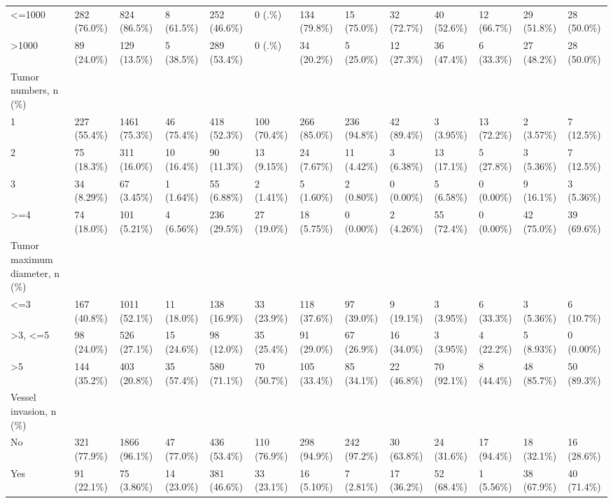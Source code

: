 \begin{landscape}
\begin{center}
\begin{longtable}{p{5.2cm}p{3.0cm}}
<=1000 & 282 (76.0\%) & 824 (86.5\%) & 8 (61.5\%) & 252 (46.6\%) & 0 (.\%) & 134 (79.8\%) & 15 (75.0\%) & 32 (72.7\%) & 40 (52.6\%) & 12 (66.7\%) & 29 (51.8\%) & 28 (50.0\%) \\
>1000 & 89 (24.0\%) & 129 (13.5\%) & 5 (38.5\%) & 289 (53.4\%) & 0 (.\%) & 34 (20.2\%) & 5 (25.0\%) & 12 (27.3\%) & 36 (47.4\%) & 6 (33.3\%) & 27 (48.2\%) & 28 (50.0\%) \\
Tumor numbers, n (\%) &  &  &  &  &  &  &  &  &  &  &  &  \\
1 & 227 (55.4\%) & 1461 (75.3\%) & 46 (75.4\%) & 418 (52.3\%) & 100 (70.4\%) & 266 (85.0\%) & 236 (94.8\%) & 42 (89.4\%) & 3 (3.95\%) & 13 (72.2\%) & 2 (3.57\%) & 7 (12.5\%) \\
2 & 75 (18.3\%) & 311 (16.0\%) & 10 (16.4\%) & 90 (11.3\%) & 13 (9.15\%) & 24 (7.67\%) & 11 (4.42\%) & 3 (6.38\%) & 13 (17.1\%) & 5 (27.8\%) & 3 (5.36\%) & 7 (12.5\%) \\
3 & 34 (8.29\%) & 67 (3.45\%) & 1 (1.64\%) & 55 (6.88\%) & 2 (1.41\%) & 5 (1.60\%) & 2 (0.80\%) & 0 (0.00\%) & 5 (6.58\%) & 0 (0.00\%) & 9 (16.1\%) & 3 (5.36\%) \\
>=4 & 74 (18.0\%) & 101 (5.21\%) & 4 (6.56\%) & 236 (29.5\%) & 27 (19.0\%) & 18 (5.75\%) & 0 (0.00\%) & 2 (4.26\%) & 55 (72.4\%) & 0 (0.00\%) & 42 (75.0\%) & 39 (69.6\%) \\
Tumor maximum diameter, n (\%) &  &  &  &  &  &  &  &  &  &  &  &  \\
<=3 & 167 (40.8\%) & 1011 (52.1\%) & 11 (18.0\%) & 138 (16.9\%) & 33 (23.9\%) & 118 (37.6\%) & 97 (39.0\%) & 9 (19.1\%) & 3 (3.95\%) & 6 (33.3\%) & 3 (5.36\%) & 6 (10.7\%) \\
>3, <=5 & 98 (24.0\%) & 526 (27.1\%) & 15 (24.6\%) & 98 (12.0\%) & 35 (25.4\%) & 91 (29.0\%) & 67 (26.9\%) & 16 (34.0\%) & 3 (3.95\%) & 4 (22.2\%) & 5 (8.93\%) & 0 (0.00\%) \\
>5 & 144 (35.2\%) & 403 (20.8\%) & 35 (57.4\%) & 580 (71.1\%) & 70 (50.7\%) & 105 (33.4\%) & 85 (34.1\%) & 22 (46.8\%) & 70 (92.1\%) & 8 (44.4\%) & 48 (85.7\%) & 50 (89.3\%) \\
Vessel invasion, n (\%) &  &  &  &  &  &  &  &  &  &  &  &  \\
No & 321 (77.9\%) & 1866 (96.1\%) & 47 (77.0\%) & 436 (53.4\%) & 110 (76.9\%) & 298 (94.9\%) & 242 (97.2\%) & 30 (63.8\%) & 24 (31.6\%) & 17 (94.4\%) & 18 (32.1\%) & 16 (28.6\%) \\
Yes & 91 (22.1\%) & 75 (3.86\%) & 14 (23.0\%) & 381 (46.6\%) & 33 (23.1\%) & 16 (5.10\%) & 7 (2.81\%) & 17 (36.2\%) & 52 (68.4\%) & 1 (5.56\%) & 38 (67.9\%) & 40 (71.4\%) \\

\end{longtable}
\end{center}
\end{landscape}
